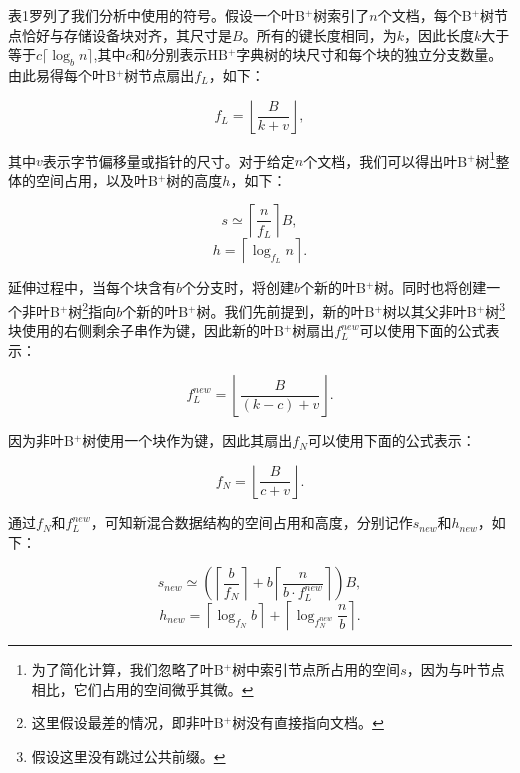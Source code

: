 表1罗列了我们分析中使用的符号。假设一个叶B$^+$树索引了$n$个文档，每个B$^+$树节点恰好与存储设备块对齐，其尺寸是$B$。所有的键长度相同，为$k$，因此长度$k$大于等于$c\lceil\log_bn\rceil$,其中$c$和$b$分别表示HB$^+$字典树的块尺寸和每个块的独立分支数量。由此易得每个叶B$^+$树节点扇出$f_L$，如下：

\begin{equation}
f_L=\left\lfloor\frac{B}{k+v}\right\rfloor, \label{equation1}
\end{equation}

其中$v$表示字节偏移量或指针的尺寸。对于给定$n$个文档，我们可以得出叶B$^+$树\footnote{为了简化计算，我们忽略了叶B$^+$树中索引节点所占用的空间$s$，因为与叶节点相比，它们占用的空间微乎其微。}整体的空间占用，以及叶B$^+$树的高度$h$，如下：

\begin{equation}
s\simeq\left\lceil\frac{n}{f_L}\right\rceil B, \label{equation2}
\end{equation}
\begin{equation}
h=\left\lceil\log_{f_L}n\right\rceil. \label{equation3}
\end{equation}

延伸过程中，当每个块含有$b$个分支时，将创建$b$个新的叶B$^+$树。同时也将创建一个非叶B$^+$树\footnote{这里假设最差的情况，即非叶B$^+$树没有直接指向文档。}指向$b$个新的叶B$^+$树。我们先前提到，新的叶B$^+$树以其父非叶B$^+$树\footnote{假设这里没有跳过公共前缀。}块使用的右侧剩余子串作为键，因此新的叶B$^+$树扇出$f_L^{new}$可以使用下面的公式表示：

\begin{equation}
f_L^{new}=\left\lfloor\frac{B}{(k-c)+v}\right\rfloor. \label{equation4}
\end{equation}

因为非叶B$^+$树使用一个块作为键，因此其扇出$f_N$可以使用下面的公式表示：

\begin{equation}
f_N=\left\lfloor\frac{B}{c+v}\right\rfloor. \label{equation5}
\end{equation}

通过$f_N$和$f_L^{new}$，可知新混合数据结构的空间占用和高度，分别记作$s_{new}$和$h_{new}$，如下：

\begin{equation}
s_{new}\simeq\left(\left\lceil\frac{b}{f_N}\right\rceil+b\left\lceil\frac{n}{b\cdot f_L^{new}}\right\rceil\right) B, \label{equation6}
\end{equation}
\begin{equation}
h_{new}=\left\lceil\log_{f_N}b\right\rceil+\left\lceil\log_{f_N^{new}}\frac{n}{b}\right\rceil. \label{equation7}
\end{equation}

